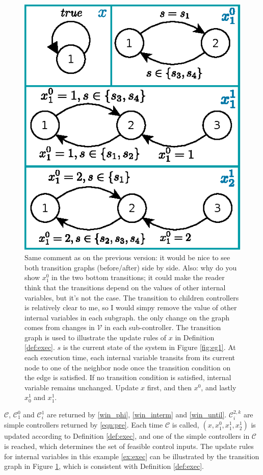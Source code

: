 \begin{example}
	\begin{figure}
		\centering
		\includegraphics[width=0.7\linewidth]{pic/xupdate}
		\caption{ {\color{purple} Same comment as on the previous version: it would be nice to see both transition graphs (before/after) side by side. Also: why do you show $x_1^0$ in the two bottom 
        transitions; it could make the reader think that the transitions depend on the values of other internal variables, but it's not the case. The transition to children controllers is relatively clear to me, so I would simpy remove the value of other internal variables in each subgraph.}{\color{teal} the only change on the graph comes from changes in $ \mathcal{V} $ in each sub-controller. } 
        The transition graph is used to illustrate the update rules of $ x $ in Definition \ref{def:exec}. $ s $ is the current state of the system in Figure \ref{fig:eg1}. At each execution time, each internal variable transits from its current node to one of the neighbor node once the transition condition on the edge is satisfied. If no transition condition is satisfied, internal variable remains unchanged. Update $ x$ first, and then $ x^0 $, and lastly $ x_0^1 $ and $x^1_1 $.} 
		\label{fig:xupdate}
	\end{figure}
	
	$ \mathcal{C} $, $ \mathcal{C}_1^0 $ and $ \mathcal{C}_i^1 $ are returned by \eqref{win_phi}, \eqref{win_interm} and \eqref{win_until}. $ \mathcal{C}_i^{2,k} $ are simple controllers returned by \eqref{eqn:pre}. Each time $ \mathcal{C} $ is called, $ (x,x^0_1,x^1_1,x^1_2) $ is updated according to Definition \ref{def:exec}, and one of the simple controllers in $ \mathcal{C} $ is reached, which determines the set of feasible control inputs. The update rules for internal variables in this example \ref{ex:exec} can be illustrated by the transition graph in Figure \ref{fig:xupdate}, which is consistent with Definition \ref{def:exec}. %
	

\end{example}
